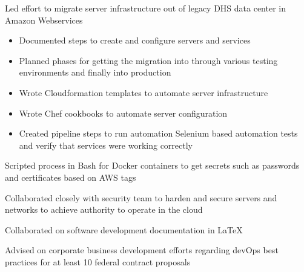 \begin{cventries}
{\begin{cvitems}
        \item {Led effort to migrate server infrastructure out of legacy DHS data center in Amazon Webservices}
        \begin{itemize}
          \item {Documented steps to create and configure servers and services}
          \item {Planned phases for getting the migration into through various testing environments and finally into production}
          \item {Wrote Cloudformation templates to automate server infrastructure}
          \item {Wrote Chef cookbooks to automate server configuration}
          \item {Created pipeline steps to run automation Selenium based automation tests and verify that services were working correctly}
        \end{itemize}
        \item {Scripted process in Bash for Docker containers to get secrets such as passwords and certificates based on AWS tags}
        \item {Collaborated closely with security team to harden and secure servers and networks to achieve authority to operate in the cloud}
        \item {Collaborated on software development documentation in LaTeX}
        \item {Advised on corporate business development efforts regarding devOps best practices for at least 10 federal contract proposals}
      \end{cvitems}
    }



\end{cventries}
